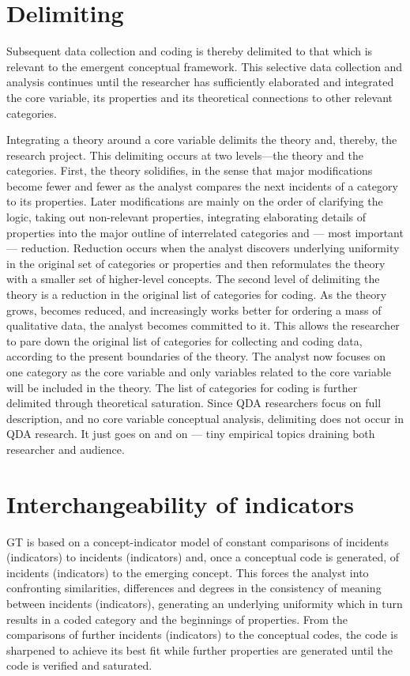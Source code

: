 \section*{Delimiting}

Subsequent data collection and coding is thereby delimited to that which is relevant to the emergent conceptual framework. 
This selective data collection and analysis continues until the researcher has sufficiently elaborated and integrated the core variable, 
its properties and its theoretical connections to other relevant categories.

Integrating a theory around a core variable delimits the theory and, thereby, the research project. 
This delimiting occurs at two levels—the theory and the categories. 
First, the theory solidifies, 
in the sense that major modifications become fewer and fewer as the analyst compares the next incidents of a category to its properties. 
Later modifications are mainly on the order of clarifying the logic, 
taking out non-relevant properties, 
integrating elaborating details of properties into the major outline of interrelated categories and --- most important --- reduction. 
Reduction occurs when the analyst discovers underlying uniformity in the original set of categories or properties and then reformulates the theory with a smaller set of higher-level concepts. 
The second level of delimiting the theory is a reduction in the original list of categories for coding. 
As the theory grows, becomes reduced, 
and increasingly works better for ordering a mass of qualitative data, 
the analyst becomes committed to it.
This allows the researcher to pare down the original list of categories for
collecting and coding data, 
according to the present boundaries of the theory.
The analyst now focuses on one category as the core variable and only
variables related to the core variable will be included in the theory. 
The list of categories for coding is further delimited through theoretical saturation. 
Since QDA researchers focus on full description, 
and no core variable conceptual analysis, 
delimiting does not occur in QDA research. 
It just goes on and on --- tiny empirical topics draining both researcher and audience.

\section*{Interchangeability of indicators}

GT is based on a concept-indicator model of constant comparisons of incidents (indicators) to incidents (indicators) and, 
once a conceptual code is generated,
of incidents (indicators) to the emerging concept. 
This forces the analyst into confronting similarities, 
differences and degrees in the consistency of meaning between incidents (indicators), 
generating an underlying uniformity which in turn results in a coded category and the beginnings of properties. 
From the comparisons of further incidents (indicators) to the conceptual codes, 
the code is sharpened to achieve its best fit while further properties are generated until the code is verified and saturated.

